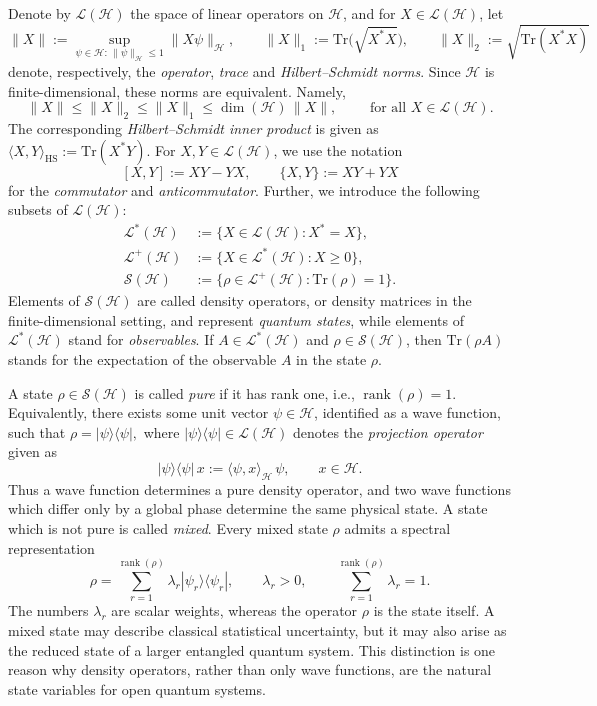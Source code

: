 \documentclass[10pt,a4paper,reqno]{amsart}
\numberwithin{equation}{section}
\theoremstyle{plain}
\theoremstyle{definition}
\theoremstyle{remark}
\newcommand{\Tr}{\mathrm{Tr}}
\newcommand{\cS}{\mathcal S}
\newcommand{\cL}{\mathcal L}
\newcommand{\HH}{\mathcal H}
\newcommand{\1}{\mathbf 1}
\begin{document}
Denote by $\cL(\HH)$ the space of linear operators on $\HH$,  and for
$X\in\cL(\HH)$, let
\[
  \|X\|
  :=
  \sup_{\psi\in\HH:\,\|\psi\|_{\HH}\le1}
  \|X\psi\|_{\HH},
  \qquad
  \|X\|_1
  :=
  \Tr\bigl(\sqrt{X^*X}\bigr),
  \qquad
  \|X\|_2
  :=
  \sqrt{\Tr(X^*X)}
\]
denote, respectively, the \emph{operator},  \emph{trace} and \emph{Hilbert--Schmidt norms}.  Since
$\HH$ is finite-dimensional, these norms are equivalent. Namely,  
\[
  \|X\|
  \le
  \|X\|_2
  \le
  \|X\|_1
  \le
  \dim(\HH)\,\|X\|,\qquad \mbox{ for all } X\in\cL(\HH).
\]
The corresponding \emph{Hilbert--Schmidt inner product} is given as 
\(
  \langle X,Y\rangle_{\mathrm{HS}}
  :=
  \Tr(X^*Y). 
\)
For $X,Y\in\cL(\HH)$, we use the notation
\[
  [X,Y]:=XY-YX,
  \qquad
  \{X,Y\}:=XY+YX
\]
for the \emph{commutator} and \emph{anticommutator}.  Further,  we introduce the following subsets of $\cL(\HH)$:
\begin{align*}
  \cL^*(\HH)
  &:=
  \{X\in\cL(\HH):X^*=X\},
  \\
  \cL^+(\HH)
  &:=
  \{X\in\cL^*(\HH):X\ge0\},
  \\
  \cS(\HH)
  &:=
  \{\rho\in\cL^+(\HH):\Tr(\rho)=1\}.
\end{align*}
Elements of $\cS(\HH)$ are called density operators,  or density matrices in the finite-dimensional setting,  and represent \emph{quantum states},  while elements of $\cL^*(\HH)$ stand for  \emph{observables}.  If
$A\in\cL^*(\HH)$ and $\rho\in\cS(\HH)$, then
\(
  \Tr(\rho A)
\)
stands for the expectation of the observable $A$ in the state $\rho$.

\medskip

A state $\rho\in\cS(\HH)$ is called \emph{pure} if it has rank one,  i.e.,  $\operatorname{rank}(\rho)=1$.  
Equivalently, there exists some unit vector $\psi\in\HH$,  identified as a wave function,  such that
\(
  \rho=|\psi\rangle\langle\psi|,
\)
where $ |\psi\rangle\langle\psi| \in \cL(\HH)$ denotes the \emph{projection operator} given as
\[
  |\psi\rangle\langle\psi|\,x
  :=
  \langle\psi,x\rangle_{\HH}\,\psi,
  \qquad
  x\in\HH.
\]
Thus a wave function determines a pure density operator, and two wave functions
which differ only by a global phase determine the same physical state.  A state
which is not pure is called \emph{mixed}.  Every mixed state $\rho$ admits a spectral
representation
\[
  \rho
  =
  \sum_{r=1}^{\operatorname{rank}(\rho)}
  \lambda_r|\psi_r\rangle\langle\psi_r|,
  \qquad
  \lambda_r>0,
  \qquad
  \sum_{r=1}^{\operatorname{rank}(\rho)}\lambda_r=1.
\]
The numbers
\(\lambda_r\) are scalar weights, whereas the operator \(\rho\) is the
state itself.  A mixed state may describe classical statistical uncertainty,
but it may also arise as the reduced state of a larger entangled quantum
system.  This distinction is one reason why density operators, rather than
only wave functions, are the natural state variables for open quantum
systems.
\end{document}
